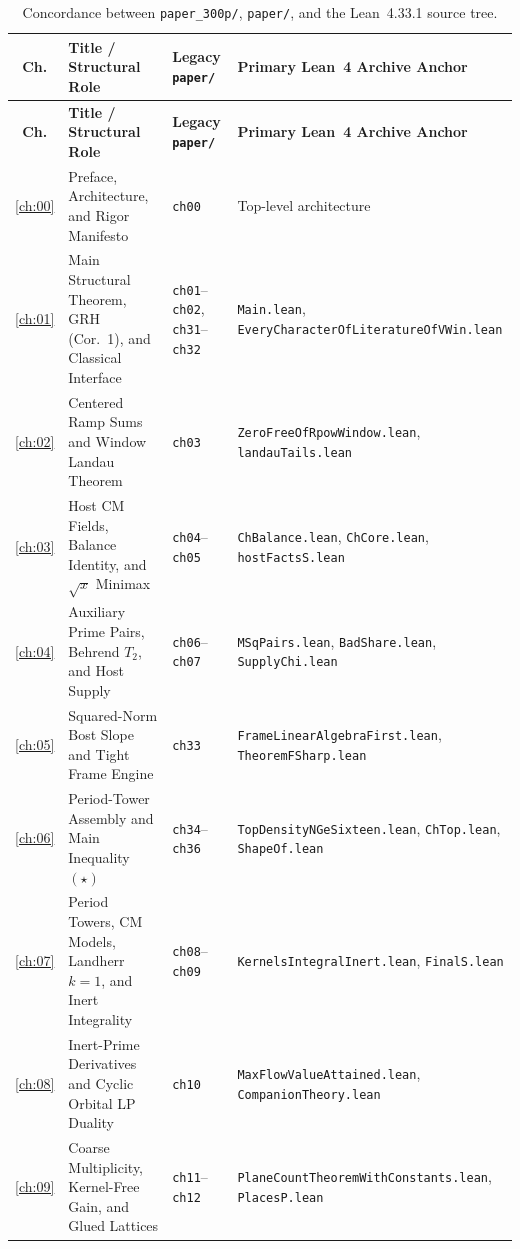 \begin{longtable}{@{}c>{\raggedright\arraybackslash}p{5.6cm}>{\raggedright\arraybackslash}p{2.6cm}>{\raggedright\arraybackslash}p{6.4cm}@{}}
\caption{Concordance between \texttt{paper\_300p/}, \texttt{paper/}, and the Lean~4.33.1 source tree.}
\label{tab:appB:concordance}\\
\toprule
\textbf{Ch.} & \textbf{Title / Structural Role} & \textbf{Legacy \texttt{paper/}} & \textbf{Primary Lean~4 Archive Anchor} \\
\midrule
\endfirsthead
\toprule
\textbf{Ch.} & \textbf{Title / Structural Role} & \textbf{Legacy \texttt{paper/}} & \textbf{Primary Lean~4 Archive Anchor} \\
\midrule
\endhead
\ref{ch:00} & Preface, Architecture, and Rigor Manifesto & \texttt{ch00} & Top-level architecture \\
\ref{ch:01} & Main Structural Theorem, GRH (Cor.~1), and Classical Interface & \texttt{ch01}--\texttt{ch02}, \texttt{ch31}--\texttt{ch32} & \texttt{Main.lean}, \texttt{EveryCharacterOfLiteratureOfVWin.lean} \\
\ref{ch:02} & Centered Ramp Sums and Window Landau Theorem & \texttt{ch03} & \texttt{ZeroFreeOfRpowWindow.lean}, \texttt{landauTails.lean} \\
\ref{ch:03} & Host CM Fields, Balance Identity, and $\sqrt{x}$ Minimax & \texttt{ch04}--\texttt{ch05} & \texttt{ChBalance.lean}, \texttt{ChCore.lean}, \texttt{hostFactsS.lean} \\
\ref{ch:04} & Auxiliary Prime Pairs, Behrend $T_2$, and Host Supply & \texttt{ch06}--\texttt{ch07} & \texttt{MSqPairs.lean}, \texttt{BadShare.lean}, \texttt{SupplyChi.lean} \\
\ref{ch:05} & Squared-Norm Bost Slope and Tight Frame Engine & \texttt{ch33} & \texttt{FrameLinearAlgebraFirst.lean}, \texttt{TheoremFSharp.lean} \\
\ref{ch:06} & Period-Tower Assembly and Main Inequality $(\star)$ & \texttt{ch34}--\texttt{ch36} & \texttt{TopDensityNGeSixteen.lean}, \texttt{ChTop.lean}, \texttt{ShapeOf.lean} \\
\ref{ch:07} & Period Towers, CM Models, Landherr $k{=}1$, and Inert Integrality & \texttt{ch08}--\texttt{ch09} & \texttt{KernelsIntegralInert.lean}, \texttt{FinalS.lean} \\
\ref{ch:08} & Inert-Prime Derivatives and Cyclic Orbital LP Duality & \texttt{ch10} & \texttt{MaxFlowValueAttained.lean}, \texttt{CompanionTheory.lean} \\
\ref{ch:09} & Coarse Multiplicity, Kernel-Free Gain, and Glued Lattices & \texttt{ch11}--\texttt{ch12} & \texttt{PlaneCountTheoremWithConstants.lean}, \texttt{PlacesP.lean} \\

\end{longtable}

